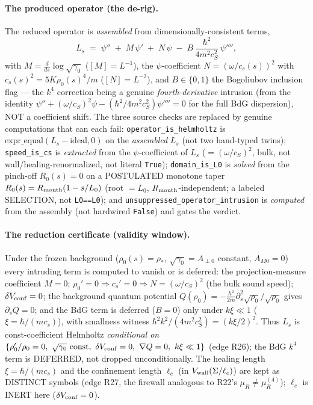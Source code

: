 \paragraph{The produced operator (the de-rig).}
The reduced operator is \emph{assembled} from dimensionally-consistent terms,
\[
  L_s \;=\; \psi'' \;+\; M\,\psi' \;+\; N\,\psi \;-\; B\,\frac{\hbar^2}{4m^2c_S^2}\,\psi'''' ,
\]
with \(M=\tfrac{d}{ds}\log\sqrt{\gamma_0}\) (\([M]=L^{-1}\)), the
\(\psi\)-coefficient \(N=(\omega/c_s(s))^2\) with \(c_s(s)^2=5K\rho_0(s)^4/m\)
(\([N]=L^{-2}\)), and \(B\in\{0,1\}\) the Bogoliubov inclusion flag --- the
\(k^4\) correction being a genuine \emph{fourth-derivative} intrusion (from the
identity \(\psi''+(\omega/c_S)^2\psi-(\hbar^2/4m^2c_S^2)\psi''''=0\) for the full
BdG dispersion), NOT a coefficient shift. The three source checks are replaced
by genuine computations that can each fail: \texttt{operator\_is\_helmholtz} is
\(\mathrm{expr\_equal}(L_s-\text{ideal},0)\) on the \emph{assembled} \(L_s\) (not
two hand-typed twins); \texttt{speed\_is\_cs} is \emph{extracted} from the
\(\psi\)-coefficient of \(L_s\) (\(=(\omega/c_S)^2\), bulk, not
wall/healing-renormalized, not literal \texttt{True}); \texttt{domain\_is\_L0} is
\emph{solved} from the pinch-off \(R_0(s)=0\) on a POSTULATED monotone taper
\(R_0(s)=R_{\rm mouth}(1-s/L_0)\) (root \(=L_0\), \(R_{\rm mouth}\)-independent;
a labeled SELECTION, not \texttt{L0==L0}); and
\texttt{unsuppressed\_operator\_intrusion} is \emph{computed} from the assembly
(not hardwired \texttt{False}) and gates the verdict.

\paragraph{The reduction certificate (validity window).}
Under the frozen background (\(\rho_0(s)=\rho_*\), \(\sqrt{\gamma_0}=A_{\perp0}\)
constant, \(A_{M0}=0\)) every intruding term is computed to vanish or is
deferred: the projection-measure coefficient \(M=0\); \(\rho_0'=0\Rightarrow
c_s'=0\Rightarrow N=(\omega/c_S)^2\) (the bulk sound speed); \(\delta V_{\rm
conf}=0\); the background quantum potential
\(Q(\rho_0)=-\tfrac{\hbar^2}{2m}\partial_s^2\sqrt{\rho_0}/\sqrt{\rho_0}\) gives
\(\partial_s Q=0\); and the BdG term is deferred (\(B=0\)) only under
\(k\xi\ll1\) (\(\xi=\hbar/(mc_s)\)), with smallness witness
\(\hbar^2k^2/(4m^2c_S^2)=(k\xi/2)^2\). Thus \(L_s\) is const-coefficient
Helmholtz \emph{conditional on}
\(\{\rho_0'/\rho_0=0,\ \sqrt{\gamma_0}\ \text{const},\ \delta V_{\rm conf}=0,\
\nabla Q=0,\ k\xi\ll1\}\) (edge R26); the BdG \(k^4\) term is DEFERRED, not
dropped unconditionally. The healing length \(\xi=\hbar/(mc_s)\) and the
confinement length \(\ell_c\) (in \(V_{\rm wall}(\Sigma/\ell_c)\)) are kept as
DISTINCT symbols (edge R27, the firewall analogous to R22's
\(\mu_R\neq\mu_R^{(4)}\)); \(\ell_c\) is INERT here (\(\delta V_{\rm conf}=0\)).

